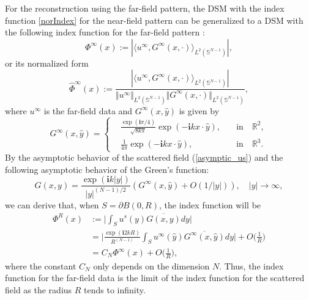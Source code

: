 \documentclass{article}
\begin{document}
For the reconstruction using the far-field pattern, the DSM with the index function \eqref{norIndex} for the near-field pattern can be generalized to a DSM with the following index function for the far-field pattern \cite{li2013direct}:
	\begin{equation}
		\Phi^{\infty}(x):=|\langle u^{\infty},G^{\infty}(x,\cdot)\rangle_{L^{2}(\mathbb{S}^{N-1})}|,
		\label{Ind_Far}
	\end{equation}
	or its normalized form
	\begin{equation}
		\hat{\Phi}^{\infty}(x):=\dfrac{|\langle u^{\infty},G^{\infty}(x,\cdot)\rangle_{L^{2}(\mathbb{S}^{N-1})}|}{\Vert u^{\infty}\Vert_{L^{2}(\mathbb{S}^{N-1})}\Vert G^{\infty}(x,\cdot) \Vert_{L^{2}(\mathbb{S}^{N-1})}},
		\label{Ind_Far_Norm}
	\end{equation}
	where $u^{\infty}$ is the far-field data and $G^{\infty}(x,\hat{y})$ is given by\cite{colton1998inverse}
	\begin{equation}
		G^{\infty}(x,\hat{y})=\left\{
		\begin{aligned}
			&\frac{\exp(\mathbf{i}\pi/4)}{\sqrt{8k\pi}}\exp(-\mathbf{i}kx\cdot \hat{y}), \quad &\text{in}\quad \mathbb{R}^2, \\
			&\frac{1}{4\pi}\exp(-\mathbf{i}kx\cdot \hat{y}), \quad &\text{in}\quad \mathbb{R}^3.
		\end{aligned}\right.
	\end{equation}
By the asymptotic behavior of the scattered field (\ref{asymptic_us}) and the following asymptotic behavior of the Green's function:
   \begin{equation}
   	  G(x,y)  =\frac{\exp(\mathbf{i}k|y|)}{|y|^{(N-1)/2}}(G^{\infty}(x,\hat{y}) + O(1/|y|)), \quad |y|\rightarrow\infty,
   \end{equation}
   we can derive that, when $S = \partial B(0,R)$, the index function will be
   \begin{equation}
   	\begin{split} 
   	\Phi^{R}(x)&:=\bigg|\int_{S}u^{s}(y)\overline{G(x,y)}dy\bigg| \\
   	&=\bigg|\frac{\exp(\mathbf{i}2kR)}{R^{(N-1)}}\int_{S}u^{\infty}(\hat{y})\overline{G^{\infty}(x,\hat{y})}dy\bigg| + O\bigg(\frac{1}{R}\bigg)\\
   	&=C_N\Phi^{\infty}(x)+O\bigg(\frac{1}{R}\bigg),
   	\end{split} 	 
   \label{conver_Ind}
   \end{equation}
where the constant $C_N$ only depends on the dimension $N$. Thus, the index function for the far-field data is the limit of the index function for the scattered field as the radius $R$ tends to infinity.
	
\end{document}
